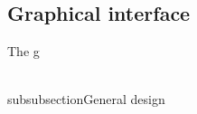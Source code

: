 \subsection{Graphical interface} %
\label{sub:graphical_interface}

The g


\\subsubsection{General design} %
\label{ssub:general_design}




